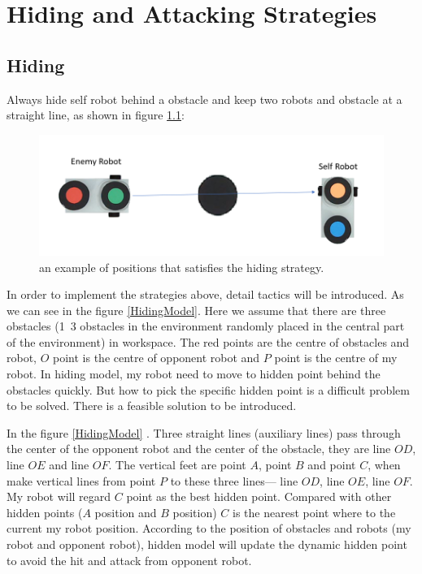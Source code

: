 \chapter{Hiding and Attacking Strategies}
\label{cha:STRATEGIES}

\section{Hiding}
Always hide self robot behind a obstacle and keep two robots and obstacle at a straight line, as shown in figure \ref{hiding_strategy}:

\begin{figure}[thb]
    \centering
    \includegraphics[width=1\textwidth]{images/hiding_strategy.png}
    \caption[hiding strategy]{an example of positions that satisfies the hiding strategy.}\label{hiding_strategy}
\end{figure}

 
In order to implement the strategies above, detail tactics will be introduced. As we can see in the figure  \ref{HidingModel}. Here we assume that there are three obstacles (1~3 obstacles in the environment randomly placed in the central part of the environment) in workspace. The red points are the centre of obstacles and robot,  $O$ point is the centre of opponent robot and $P$ point is the centre of my robot. In hiding model, my robot need to move to hidden point behind the obstacles quickly. But how to pick the specific hidden point is a difficult problem to be solved. There is a feasible solution to be introduced.

In the figure  \ref{HidingModel} . Three straight lines (auxiliary lines) pass through the center of the opponent robot and the center of the obstacle, they are line $OD$, line $OE$ and line $OF$. The vertical feet are point $A$, point $B$ and point $C$, when make vertical lines from point $P$ to these three lines— line $OD$, line $OE$, line $OF$. My robot will regard $C$ point as the best hidden point. Compared with other hidden points ($A$ position and $B$ position) $C$ is the nearest point where to the current my robot position. According to the position of obstacles and robots (my robot and opponent robot), hidden model will update the dynamic hidden point to avoid the hit and attack from opponent robot.

